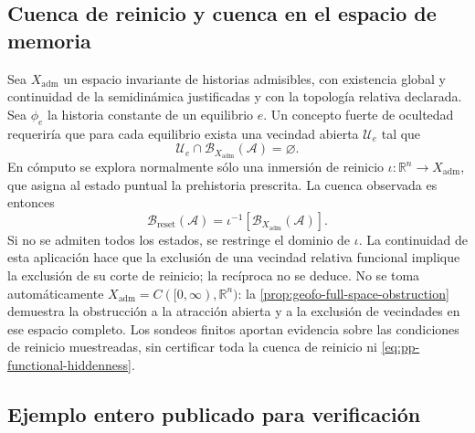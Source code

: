 \subsection{Cuenca de reinicio y cuenca en el espacio de memoria}

Sea \(X_{\mathrm{adm}}\) un espacio invariante de historias admisibles,
con existencia global y continuidad de la semidinámica justificadas y con
la topología relativa declarada. Sea \(\phi_e\) la historia constante de un
equilibrio \(e\). Un concepto fuerte de ocultedad requeriría que para cada
equilibrio exista una vecindad abierta \(\mathcal U_e\) tal que
\begin{equation}
 \mathcal U_e\cap\mathcal B_{X_{\mathrm{adm}}}(\mathcal A)=\varnothing.
 \label{eq:pp-functional-hiddenness}
\end{equation}
En cómputo se explora normalmente sólo una inmersión de reinicio
\(\iota:\mathbb R^n\to X_{\mathrm{adm}}\), que asigna al estado puntual la
prehistoria prescrita. La cuenca observada es entonces
\begin{equation}
 \mathcal B_{\mathrm{reset}}(\mathcal A)
 =\iota^{-1}[\mathcal B_{X_{\mathrm{adm}}}(\mathcal A)].
 \label{eq:pp-reset-section-basin}
\end{equation}
Si no se admiten todos los estados, se restringe el dominio de \(\iota\).
La continuidad de esta aplicación hace que la exclusión de una vecindad
relativa funcional implique la exclusión de su corte de reinicio; la
recíproca no se deduce. No se toma automáticamente
\(X_{\mathrm{adm}}=C([0,\infty),\mathbb R^n)\): la
\cref{prop:geofo-full-space-obstruction} demuestra la obstrucción a la
atracción abierta y a la exclusión de vecindades en ese espacio completo.
Los sondeos finitos aportan evidencia sobre las condiciones de reinicio
muestreadas, sin certificar toda la cuenca de reinicio ni
\cref{eq:pp-functional-hiddenness}.

\subsection{Ejemplo entero publicado para verificación}


